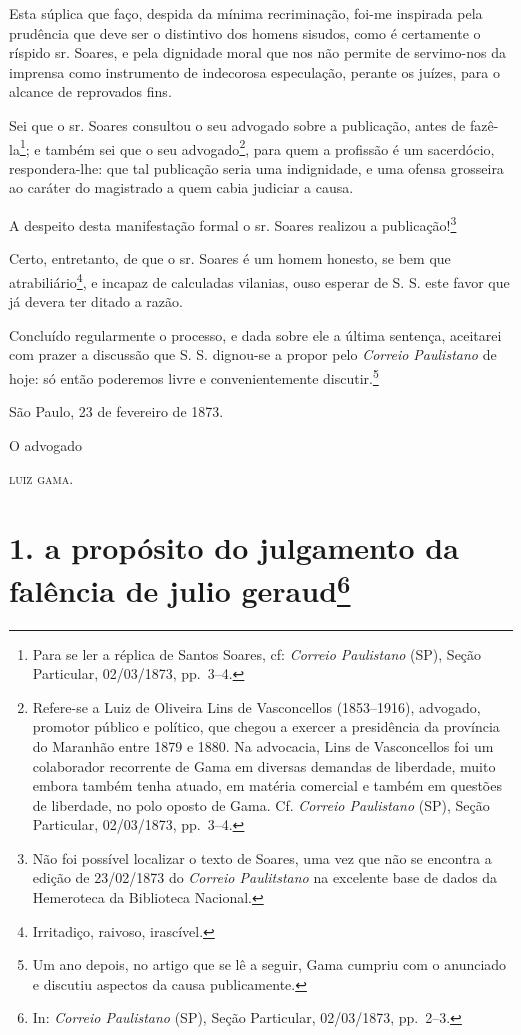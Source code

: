 Esta súplica que faço, despida da mínima recriminação, foi-me inspirada
pela prudência que deve ser o distintivo dos homens sisudos, como é
certamente o ríspido sr. Soares, e pela dignidade moral que nos não
permite de servimo-nos da imprensa como instrumento de indecorosa
especulação, perante os juízes, para o alcance de reprovados fins.

Sei que o sr. Soares consultou o seu advogado sobre a publicação, antes
de fazê-la\footnote{ Para se ler a réplica de Santos Soares, cf:
  \emph{Correio Paulistano} (SP), Seção Particular, 02/03/1873, pp.~3--4.};
e também sei que o seu advogado\footnote{ Refere-se a Luiz de Oliveira
  Lins de Vasconcellos (1853--1916), advogado, promotor público e
  político, que chegou a exercer a presidência da província do Maranhão
  entre 1879 e 1880. Na advocacia, Lins de Vasconcellos foi um
  colaborador recorrente de Gama em diversas demandas de liberdade,
  muito embora também tenha atuado, em matéria comercial e também em
  questões de liberdade, no polo oposto de Gama. Cf. \emph{Correio
  Paulistano} (SP), Seção Particular, 02/03/1873, pp.~3--4.}, para quem a
profissão é um sacerdócio, respondera-lhe: que tal publicação seria uma
indignidade, e uma ofensa grosseira ao caráter do magistrado a quem
cabia judiciar a causa.

A despeito desta manifestação formal o sr. Soares realizou a
publicação!\footnote{ Não foi possível localizar o texto de Soares, uma
  vez que não se encontra a edição de 23/02/1873 do \emph{Correio
  Paulitstano} na excelente base de dados da Hemeroteca da Biblioteca
  Nacional.}

Certo, entretanto, de que o sr. Soares é um homem honesto, se bem que
atrabiliário\footnote{ Irritadiço, raivoso, irascível.}, e incapaz de
calculadas vilanias, ouso esperar de S. S. este favor que já devera ter
ditado a razão.

Concluído regularmente o processo, e dada sobre ele a última sentença,
aceitarei com prazer a discussão que S. S. dignou-se a propor pelo
\emph{Correio Paulistano} de hoje: só então poderemos livre e
convenientemente discutir.\footnote{ Um ano depois, no artigo que se lê
  a seguir, Gama cumpriu com o anunciado e discutiu aspectos da causa
  publicamente.}

São Paulo, 23 de fevereiro de 1873.

O advogado

\textsc{luiz gama}.

\chapter{1. a propósito do julgamento da falência de julio geraud\footnote{ In: \emph{Correio Paulistano} (SP), Seção Particular,
  02/03/1873, pp.~2--3.}} %


